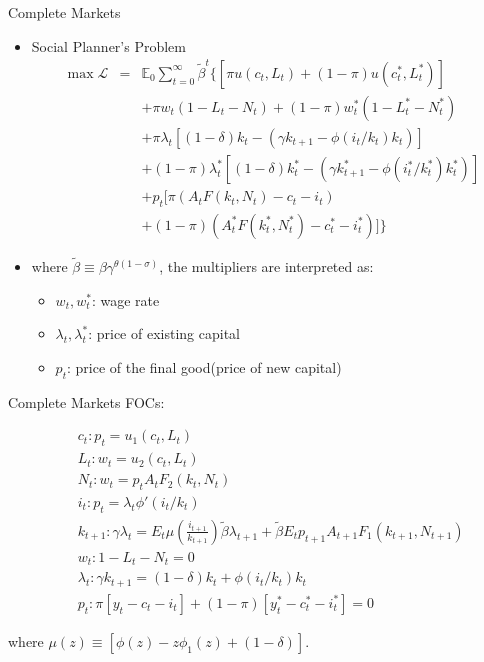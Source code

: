 \documentclass[10pt]{beamer}
\begin{document}
\begin{frame}{Complete Markets}
\begin{itemize}
    \item Social Planner's Problem
\begin{eqnarray*}
\max \mathcal{L}&=&\mathbb{E}_0 \sum_{t=0}^{\infty}\tilde{\beta}^t \{[\pi u(c_t,L_t)+(1-\pi)u(c_t^*,L_t^*)]\\
&&+ \pi w_t(1-L_t-N_t)+(1-\pi)w_t^*(1-L_t^*-N_t^*) \\
&&+\pi \lambda_t [(1-\delta)k_t-(\gamma k_{t+1}-\phi(i_t/k_t)k_t)] \\
&&+(1-\pi)\lambda_t^*[(1-\delta)k_t^*-(\gamma k_{t+1}^*-\phi(i_t^*/k_t^*)k_t^*)] \\
&&+p_t[\pi(A_tF(k_t,N_t)-c_t-i_t) \\
&&+(1-\pi)(A_t^*F(k_t^*,N_t^*)-c_t^*-i_t^*)]\}
\end{eqnarray*}
\item where $\tilde{\beta} \equiv \beta\gamma^{\theta(1-\sigma)}$, the multipliers are interpreted as:
\begin{itemize}
  \item $w_t,w_t^*$: wage rate
  \item $\lambda_t,\lambda_t^*$: price of existing capital
  \item $p_t$: price of the final good(price of new capital)
\end{itemize}
\end{itemize}


\end{frame}

\begin{frame}{Complete Markets}
FOCs:
\begin{small}
\begin{eqnarray}
&&c_t:p_t=u_1(c_t,L_t)\\
&&L_t:w_t=u_2(c_t,L_t)\\
&&N_t:w_t=p_tA_tF_2(k_t,N_t) \\
&&i_t:p_t=\lambda_t \phi'(i_t/k_t) \\
&&k_{t+1}:\gamma\lambda_t=E_t \mu(\frac{i_{t+1}}{k_{t+1}})\tilde{\beta}\lambda_{t+1}+\tilde{\beta}E_tp_{t+1}A_{t+1}F_1(k_{t+1},N_{t+1})\\
&&w_t:1-L_t-N_t=0 \\
&&\lambda_t:\gamma k_{t+1}=(1-\delta)k_t+\phi(i_t/k_t)k_t \\
&&p_t:\pi[y_t-c_t-i_t]+(1-\pi)[y_t^*-c_t^*-i_t^*]=0
\end{eqnarray}
\end{small}
where $\mu(z)\equiv [\phi(z)-z\phi_1(z)+(1-\delta)]$.
\end{frame}
\end{document}
